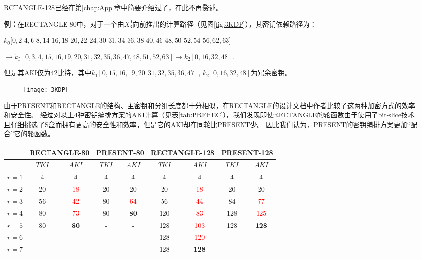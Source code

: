 RCTANGLE-128已经在第\ref{chap:App}章中简要介绍过了，在此不再赘述。

\textbf{例：}在RECTANGLE-80中，对于一个由$X_3^0$向前推出的计算路径（见图\ref{fig:3KDP}），其密钥依赖路径为：
\begin{center}
    \noindent
    \footnotesize{$k_0\hat{}[0,2$-$4,6$-$8,14$-$16,18$-$20,22$-$24,30$-$31,34$-$36,38$-$40,46$-$48,50$-$52,54$-$56,62,63]$}

  \noindent
  \centering
  \footnotesize{$\rightarrow k_1\hat{}[0,3,4,15,16,19,20,31,32,35,36,47,48,51,52,63]\rightarrow k_2\hat{}[0,16,32,48]$.}
  \end{center}
但是其AKI仅为42比特，其中$k_1\hat{}[0,15,16,19,20,31,32,35,36,47]$, $k_2\hat{}[0,16,32,48]$为冗余密钥。
\begin{figure}[htbp]
    \centering
    \texttt{[image: 3KDP]}
\end{figure}

由于PRESENT和RECTANGLE的结构、主密钥和分组长度都十分相似，在RECTANGLE的设计文档中作者比较了这两种加密方式的效率和安全性。
经过对以上4种密钥编排方案的AKI计算（见表\ref{tab:PREREC}），我们发现即使RECTANGLE的轮函数由于使用了bit-slice技术且仔细挑选了S盒而拥有更高的安全性和效率，但是它的AKI却在同轮比PRESENT少。
因此我们认为，PRESENT的密钥编排方案更加“配合”它的轮函数。

\begin{table}[tbp]
\centering
\begin{tabular}{c|cc|cc|cc|cc}
\hline
&\multicolumn{2}{c|}{RECTANGLE-80\quad}&\multicolumn{2}{c|}{PRESENT-80}&\multicolumn{2}{c|}{RECTANGLE-128\quad}&\multicolumn{2}{c}{PRESENT-128}\\
\hline
&$TKI$&\quad $AKI$&$TKI$&\quad $AKI$&$TKI$&\quad $AKI$&$TKI$&\quad $AKI$\\
$r=1$&4&4&4&4&4&4&4&4\\
$r=2$&20 & \textcolor{red}{18}&20 &20&20& \textcolor{red}{18}  &20 &20\\
$r=3$&56 &\textcolor{red}{42} &80 &\textcolor{red}{64}&56 &\textcolor{red}{44}  &84 &\textcolor{red}{77}\\
$r=4$&80 &\textcolor{red}{73} &80 &\textbf{80}&120 &\textcolor{red}{83} &128 &\textcolor{red}{125}\\
$r=5$&80 &\textbf{80}         &-  &-          &128 &\textcolor{red}{103} &128 &\textbf{128}\\
$r=6$&-&-&-&-&128 &\textcolor{red}{120}&- &-\\
$r=7$&-&-&-&-&128 &\textbf{128} &- &-\\
\hline
\end{tabular}
\end{table}

